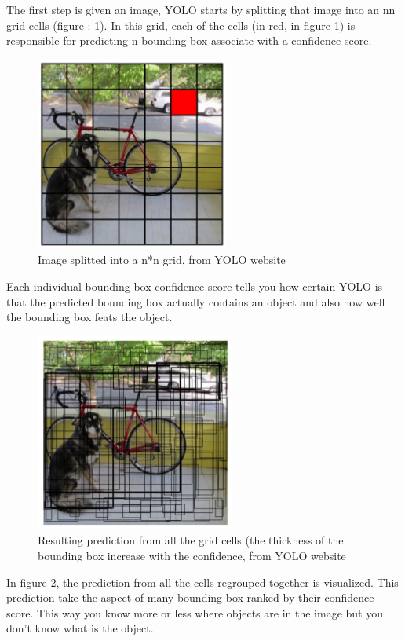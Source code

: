 The first step is given an image, YOLO starts by splitting that image into an n\*n grid cells (figure : \ref{pict:yolo_grid}). In this grid, each of the cells (in red, in figure \ref{pict:yolo_grid}) is responsible for predicting n bounding box associate with a confidence score. 

\newpage

\begin{figure} [!ht]
    \centering
    \includegraphics[width=0.4\linewidth]{images/yolo_grid.png}
    \caption{Image splitted into a n*n grid, from YOLO website}
    \label{pict:yolo_grid}
\end{figure}

Each individual bounding box confidence score tells you how certain YOLO is that the predicted bounding box actually contains an object and also how well the bounding box feats the object.

\begin{figure} [!ht]
    \centering
    \includegraphics[width=0.4\linewidth]{images/yolo_confidence.png}
    \caption{Resulting prediction from all the grid cells (the thickness of the bounding box increase with the confidence, from YOLO website}
    \label{pict:yolo_confidence}
\end{figure}

In figure \ref{pict:yolo_confidence}, the prediction from all the cells regrouped together is visualized. This prediction take the aspect of many bounding box ranked by their confidence score. This way you know more or less where objects are in the image but you don't know what is the object.

